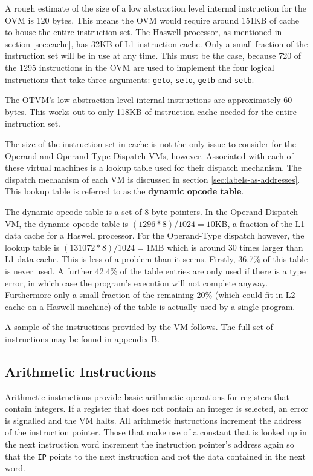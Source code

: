 \documentclass[english,a4paper,12pt]{report}
\begin{document}

A rough estimate of the size of a low abstraction level
\cite{Brunthaler20093} internal instruction for the OVM is 120
bytes. This means the OVM would require around 151KB of cache to house
the entire instruction set. The Haswell processor, as mentioned in
section \ref{sec:cache}, has 32KB of L1 instruction cache. Only a
small fraction of the instruction set will be in use at any time. This
must be the case, because 720 of the 1295 instructions in the OVM are
used to implement the four logical instructions that take three
arguments: \verb|geto|, \verb|seto|, \verb|getb| and \verb|setb|.

The OTVM's low abstraction level internal instructions are
approximately 60 bytes. This works out to only 118KB of instruction
cache needed for the entire instruction set.

The size of the instruction set in cache is not the only issue to
consider for the Operand and Operand-Type Dispatch VMs,
however. Associated with each of these virtual machines is a lookup
table used for their dispatch mechanism. The dispatch mechanism of
each VM is discussed in section \ref{sec:labels-as-addresses}. This
lookup table is referred to as the \textbf{dynamic opcode table}.

The dynamic opcode table is a set of 8-byte pointers. In the Operand
Dispatch VM, the dynamic opcode table is $(1296*8)/1024 = 10$KB, a
fraction of the L1 data cache for a Haswell processor. For the
Operand-Type dispatch however, the lookup table is
$(131072*8)/1024 = 1$MB which is around 30 times larger than L1 data
cache. This is less of a problem than it seems. Firstly, 36.7\% of
this table is never used. A further 42.4\% of the table entries are
only used if there is a type error, in which case the program's
execution will not complete anyway. Furthermore only a small fraction
of the remaining 20\% (which could fit in L2 cache on a Haswell
machine) of the table is actually used by a single program.

A sample of the instructions provided by the VM follows. The full set
of instructions may be found in appendix B.

\subsection{Arithmetic Instructions}

Arithmetic instructions provide basic arithmetic operations for
registers that contain integers. If a register that does not contain
an integer is selected, an error is signalled and the VM halts. All
arithmetic instructions increment the address of the instruction
pointer. Those that make use of a constant that is looked up in the
next instruction word increment the instruction pointer's address
again so that the \verb|IP| points to the next instruction and not the
data contained in the next word.
\end{document}
